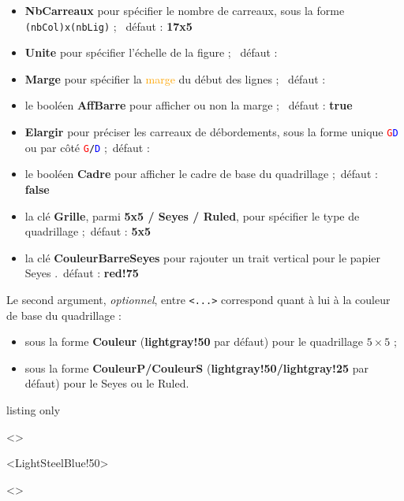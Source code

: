 \documentclass[a4paper]{article}
\newcommand\Cle[1]{{\bfseries\sffamily\textlangle #1\textrangle}}
\begin{document}
\begin{itemize}
	\item \Cle{NbCarreaux} pour spécifier le nombre de carreaux, sous la forme \texttt{(nbCol)x(nbLig)} ; \hfill~défaut : \Cle{17x5}
	\item \Cle{Unite} pour spécifier l'échelle de la figure ; \hfill~défaut : \Cle{1}
	\item \Cle{Marge} pour spécifier la \textcolor{orange}{marge} du début des lignes ; \hfill~défaut : \Cle{0}
	\item le booléen \Cle{AffBarre} pour afficher ou non la marge ; \hfill~défaut : \Cle{true}
	\item \Cle{Elargir} pour préciser les carreaux de débordements, sous la forme unique \texttt{\textcolor{red}{G}\textcolor{blue}{D}} ou par côté \texttt{\textcolor{red}{G}/\textcolor{blue}{D}} ;\hfill~défaut : \Cle{0}
	\item le booléen \Cle{Cadre} pour afficher le cadre de base du quadrillage ;\hfill~défaut : \Cle{false}
	\item la clé \Cle{Grille}, parmi \Cle{5x5 / Seyes / Ruled}, pour spécifier le type de quadrillage ;\hfill~défaut : \Cle{5x5}
	\item la clé \Cle{CouleurBarreSeyes} pour rajouter un trait vertical pour le papier Seyes .\hfill~défaut : \Cle{red!75}
\end{itemize}

Le second argument, \textit{optionnel}, entre \texttt{<...>} correspond quant à lui à la couleur de base du quadrillage :

\begin{itemize}
	\item sous la forme \Cle{Couleur} (\Cle{lightgray!50} par défaut) pour le quadrillage $5\times5$ ;
	\item sous la forme \Cle{CouleurP/CouleurS} (\Cle{lightgray!50/lightgray!25} par défaut) pour le Seyes ou le Ruled.
\end{itemize}

\medskip

\begin{PresentationCode}{listing only}

\begin{EnvQuadrillage}[NbCarreaux=18x4,Grille=Seyes,Marge=3]<\CoulSeyes>
\end{EnvQuadrillage}

\begin{EnvQuadrillage}[NbCarreaux=36x8,Elargir=3/3]<LightSteelBlue!50>
\end{EnvQuadrillage}

\begin{center}
	\begin{EnvQuadrillage}[NbCarreaux=12x3,Elargir=2/2,Grille=Ruled,Marge=2]<\CoulRuled>
	\end{EnvQuadrillage}
\end{center}
\end{PresentationCode}
\end{document}
